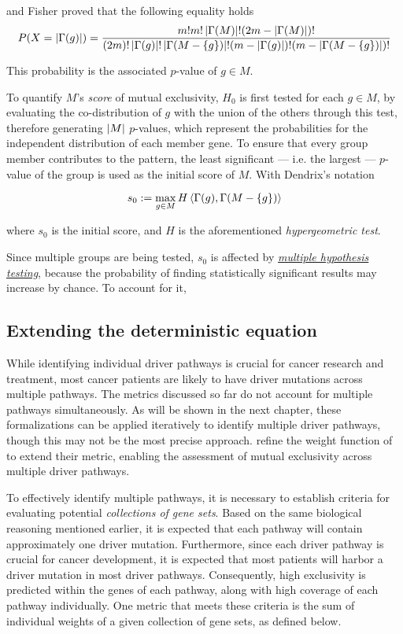 and Fisher proved that the following equality holds $$P(X = \left|\Gamma(g)\right|) = \dfrac{m!m!\left|\Gamma(M)\right|!(2m - \left|\Gamma(M)\right|)!}{(2m)!  \left|\Gamma(g)\right|! \left|\Gamma(M - \{g\})\right|!  (m - \left|\Gamma(g)\right|)! (m - \left|\Gamma(M - \{g\})\right|)!}$$

This probability is the associated $p$-value of $g \in M$.

To quantify $M$'s \textit{score} of mutual exclusivity, $H_0$ is first tested for each $g \in M$, by evaluating the co-distribution of $g$ with the union of the others through this test, therefore generating $\left|M\right|$ $p$-values, which represent the probabilities for the independent distribution of each member gene. To ensure that every group member contributes to the pattern, the least significant --- i.e. the largest --- $p$-value of the group is used as the initial score of $M$. With Dendrix's notation

\begin{equation}
    s_0 := \max_{g \in M} {H \left\langle\Gamma(g), \Gamma(M - \{g\})\right\rangle}
\end{equation}

where $s_0$ is the initial score, and $H$ is the aforementioned \textit{hypergeometric test}.

Since multiple groups are being tested, $s_0$ is affected by \href{https://en.wikipedia.org/wiki/Multiple_comparisons_problem}{\textit{multiple hypothesis testing}}, because the probability of finding statistically significant results may increase by chance. To account for it, 

\subsection{Extending the deterministic equation} \label{multi_dendrix_2nd_chap}

While identifying individual driver pathways is crucial for cancer research and treatment, most cancer patients are likely to have driver mutations across multiple pathways. The metrics discussed so far do not account for multiple pathways simultaneously. As will be shown in the next chapter, these formalizations can be applied iteratively to identify multiple driver pathways, though this may not be the most precise approach. \textcite{multi-dendrix} refine the weight function of \textcite{dendrix} to extend their metric, enabling the assessment of mutual exclusivity across multiple driver pathways.

To effectively identify multiple pathways, it is necessary to establish criteria for evaluating potential \textit{collections of gene sets}. Based on the same biological reasoning mentioned earlier, it is expected that each pathway will contain approximately one driver mutation. Furthermore, since each driver pathway is crucial for cancer development, it is expected that most patients will harbor a driver mutation in most driver pathways. Consequently, high exclusivity is predicted within the genes of each pathway, along with high coverage of each pathway individually. One metric that meets these criteria is the sum of individual weights of a given collection of gene sets, as defined below.

